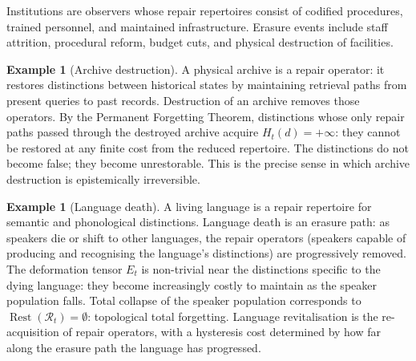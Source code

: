 \documentclass[12pt, oneside]{article}
\theoremstyle{plain}
\theoremstyle{definition}
\newtheorem{example}[theorem]{Example}
\theoremstyle{remark}
\DeclareMathOperator{\Rest}{Rest}
\newcommand{\Rt}{\mathcal{R}_t}
\newcommand{\Restzt}{\Rest(\Rt)}
\newcommand{\Et}{E_t}
\newcommand{\Hyster}{H}
\begin{document}
Institutions are observers whose repair repertoires consist of
codified procedures, trained personnel, and maintained
infrastructure.
Erasure events include staff attrition, procedural reform,
budget cuts, and physical destruction of facilities.

\begin{example}[Archive destruction]
  A physical archive is a repair operator: it restores distinctions
  between historical states by maintaining retrieval paths from
  present queries to past records.
  Destruction of an archive removes those operators.
  By the Permanent Forgetting Theorem, distinctions whose only
  repair paths passed through the destroyed archive acquire
  $\Hyster_t(d) = +\infty$: they cannot be restored at any finite
  cost from the reduced repertoire.
  The distinctions do not become false; they become unrestorable.
  This is the precise sense in which archive destruction is
  epistemically irreversible.
\end{example}

\begin{example}[Language death]
  A living language is a repair repertoire for semantic and
  phonological distinctions.
  Language death is an erasure path: as speakers die or shift to
  other languages, the repair operators (speakers capable of
  producing and recognising the language's distinctions) are
  progressively removed.
  The deformation tensor $\Et$ is non-trivial near the distinctions
  specific to the dying language: they become increasingly costly
  to maintain as the speaker population falls.
  Total collapse of the speaker population corresponds to
  $\Restzt = \emptyset$: topological total forgetting.
  Language revitalisation is the re-acquisition of repair operators,
  with a hysteresis cost determined by how far along the erasure
  path the language has progressed.
\end{example}
\end{document}
